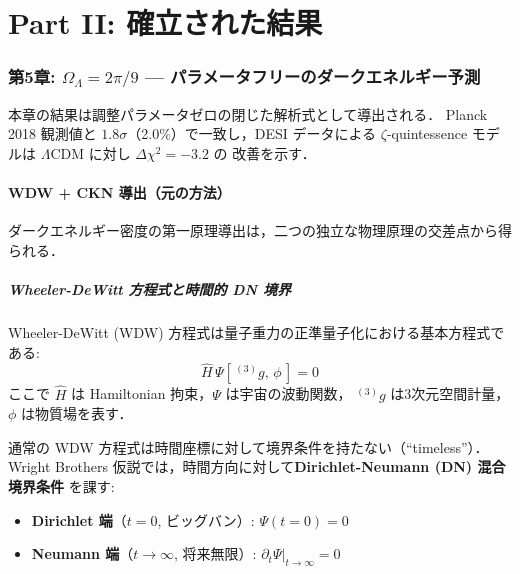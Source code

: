 
\newpage


\part*{Part II: 確立された結果}

\section{第5章: $\Omega_\Lambda = 2\pi/9$ — パラメータフリーのダークエネルギー予測}

\begin{statusbox}
本章の結果は調整パラメータゼロの閉じた解析式として導出される．
Planck 2018 観測値と $1.8\sigma$（2.0\%）で一致し，DESI データによる
$\zeta$-quintessence モデルは $\Lambda$CDM に対し $\Delta\chi^2 = -3.2$ の
改善を示す．
\end{statusbox}

\subsection{WDW + CKN 導出（元の方法）}

ダークエネルギー密度の第一原理導出は，二つの独立な物理原理の交差点から得られる．

\subsubsection{Wheeler-DeWitt 方程式と時間的 DN 境界}

Wheeler-DeWitt (WDW) 方程式は量子重力の正準量子化における基本方程式である:
\begin{equation}
\hat{H}\,\Psi[\,{}^{(3)}\!g,\,\phi\,] = 0
\end{equation}
ここで $\hat{H}$ は Hamiltonian 拘束，$\Psi$ は宇宙の波動関数，
${}^{(3)}\!g$ は3次元空間計量，$\phi$ は物質場を表す．

通常の WDW 方程式は時間座標に対して境界条件を持たない（``timeless''）．
Wright Brothers 仮説では，時間方向に対して\textbf{Dirichlet-Neumann (DN) 混合境界条件}
を課す:
\begin{itemize}
\item \textbf{Dirichlet 端}（$t = 0$, ビッグバン）: $\Psi(t=0) = 0$
\item \textbf{Neumann 端}（$t \to \infty$, 将来無限）: $\partial_t \Psi\big|_{t\to\infty} = 0$
\end{itemize}

